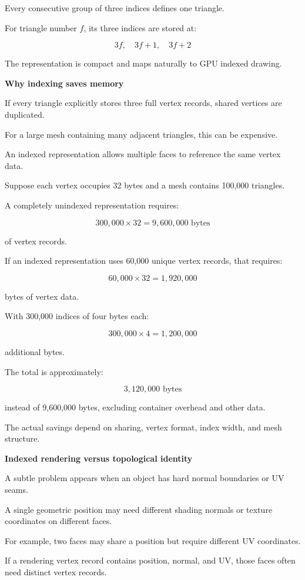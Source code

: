 Every consecutive group of three indices defines one triangle.

For triangle number \(f\), its three indices are stored at:

\[
3f,\quad3f+1,\quad3f+2
\]

The representation is compact and maps naturally to GPU indexed drawing.

\textbf{Why indexing saves memory}

If every triangle explicitly stores three full vertex records, shared vertices are duplicated.

For a large mesh containing many adjacent triangles, this can be expensive.

An indexed representation allows multiple faces to reference the same vertex data.

Suppose each vertex occupies 32 bytes and a mesh contains 100,000 triangles.

A completely unindexed representation requires:

\[
300,000\times32=9,600,000\text{ bytes}
\]

of vertex records.

If an indexed representation uses 60,000 unique vertex records, that requires:

\[
60,000\times32=1,920,000
\]

bytes of vertex data.

With 300,000 indices of four bytes each:

\[
300,000\times4=1,200,000
\]

additional bytes.

The total is approximately:

\[
3,120,000\text{ bytes}
\]

instead of 9,600,000 bytes, excluding container overhead and other data.

The actual savings depend on sharing, vertex format, index width, and mesh structure.

\textbf{Indexed rendering versus topological identity}

A subtle problem appears when an object has hard normal boundaries or UV seams.

A single geometric position may need different shading normals or texture coordinates on different faces.

For example, two faces may share a position but require different UV coordinates.

If a rendering vertex record contains position, normal, and UV, those faces often need distinct vertex records.

